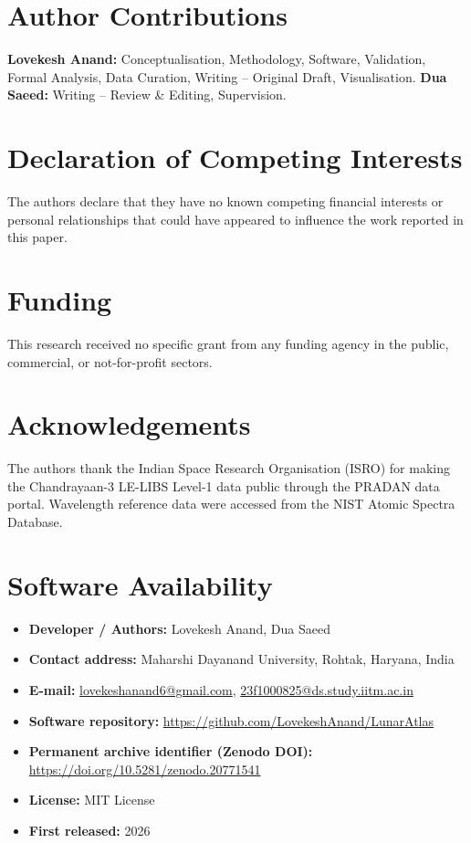 \documentclass[final,5p,twocolumn,a4paper]{elsarticle}
\begin{document}
\section*{Author Contributions}
\textbf{Lovekesh Anand:} Conceptualisation, Methodology, Software, Validation, Formal Analysis, Data Curation, Writing -- Original Draft, Visualisation.
\textbf{Dua Saeed:} Writing -- Review \& Editing, Supervision.

\section*{Declaration of Competing Interests}
The authors declare that they have no known competing financial interests or personal relationships that could have appeared to influence the work reported in this paper.

\section*{Funding}
This research received no specific grant from any funding agency in the public, commercial, or not-for-profit sectors.

\section*{Acknowledgements}
The authors thank the Indian Space Research Organisation (ISRO) for making the Chandrayaan-3 LE-LIBS Level-1 data public through the PRADAN data portal. Wavelength reference data were accessed from the NIST Atomic Spectra Database.

\section*{Software Availability}
\begin{itemize}
    \item \textbf{Developer / Authors:} Lovekesh Anand, Dua Saeed
    \item \textbf{Contact address:} Maharshi Dayanand University, Rohtak, Haryana, India
    \item \textbf{E-mail:} \href{mailto:lovekeshanand6@gmail.com}{lovekeshanand6@gmail.com}, \href{mailto:23f1000825@ds.study.iitm.ac.in}{23f1000825@ds.study.iitm.ac.in}
    \item \textbf{Software repository:} \url{https://github.com/LovekeshAnand/LunarAtlas}
    \item \textbf{Permanent archive identifier (Zenodo DOI):} \url{https://doi.org/10.5281/zenodo.20771541} \cite{lunaratlas_zenodo}
    \item \textbf{License:} MIT License
    \item \textbf{First released:} 2026
\end{itemize}
\end{document}
